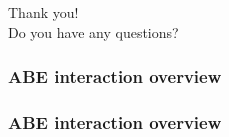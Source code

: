 \PraesentationMasterWeissBlau
\begin{frame}[c]
    \begin{center}
        \Huge Thank you!\\

        \vfill
        \Large Do you have any questions?
    \end{center}
\end{frame}


\PraesentationMasterStandard

\begin{frame}[c]
    \frametitle{ABE interaction overview}
    
\end{frame}

\begin{frame}[c]
    \frametitle{ABE interaction overview}
    
\end{frame}


